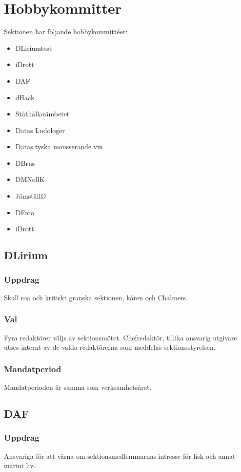 \section{Hobbykommitter}
Sektionen har följande hobbykommittéer:
\begin{itemize}
  \item DLiriumtest
  \item iDrott 
  \item DAF 
  \item dHack
  \item Ståthållarämbetet
  \item Datas Ludologer 
  \item Datas tyska mousserande vin
  \item DBrus
  \item DMNollK
  \item JämställD
  \item DFoto
  \item iDrott
\end{itemize}
\subsection{DLirium}
\subsubsection{Uppdrag}
Skall roa och kritiskt granska sektionen, kåren och Chalmers. 
\subsubsection{Val}
Fyra redaktörer väljs av sektionsmötet. Chefredaktör, tillika ansvarig utgivare utses internt av de valda redaktörerna som meddelas sektionsstyrelsen. 
\subsubsection{Mandatperiod}
Mandatperioden är samma som verksamhetsåret. 

\subsection{DAF}
\subsubsection{Uppdrag}
Ansvariga för att värna om sektionsmedlemmarnas intresse för fisk och
annat marint liv.

